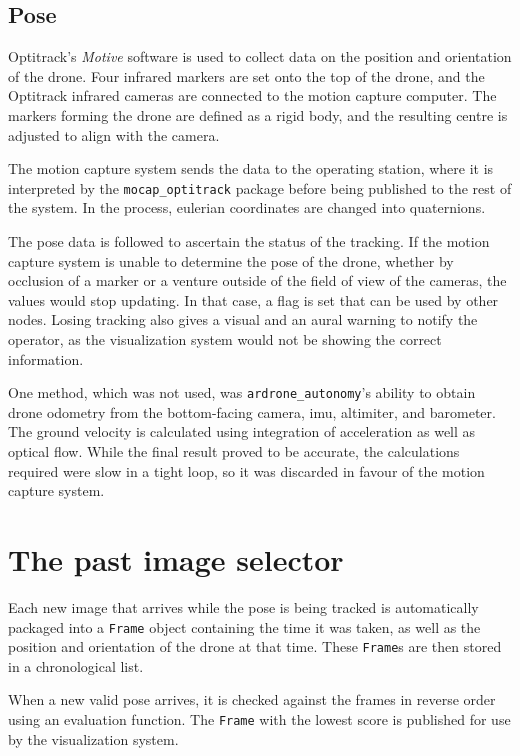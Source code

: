  \subsection{Pose}
    Optitrack's \emph{Motive} software is used to collect data on the position and orientation of the drone.
    Four infrared markers are set onto the top of the drone, and the Optitrack infrared cameras are connected to the motion capture computer.
    The markers forming the drone are defined as a rigid body, and the resulting centre is adjusted to align with the camera.

    The motion capture system sends the data to the operating station, where it is interpreted by the \verb|mocap_optitrack| package before being published to the rest of the system.
    In the process, eulerian coordinates are changed into quaternions.

    The pose data is followed to ascertain the status of the tracking.
    If the motion capture system is unable to determine the pose of the drone, whether by occlusion of a marker or a venture outside of the field of view of the cameras, the values would stop updating.
    In that case, a flag is set that can be used by other nodes.
    Losing tracking also gives a visual and an aural warning to notify the operator, as the visualization system would not be showing the correct information.

    One method, which was not used, was \verb|ardrone_autonomy|'s ability to obtain drone odometry from the bottom-facing camera, \gls{imu}, altimiter, and barometer.
    The ground velocity is calculated using integration of acceleration as well as optical flow.
    While the final result proved to be accurate, the calculations required were slow in a tight loop, so it was discarded in favour of the motion capture system.

\section{The past image selector}
  Each new image that arrives while the pose is being tracked is automatically packaged into a \texttt{Frame} object containing the time it was taken, as well as the position and orientation of the drone at that time.
  These \texttt{Frame}s are then stored in a chronological list.

  When a new valid pose arrives, it is checked against the frames in reverse order using an evaluation function.
  The \texttt{Frame} with the lowest score is published for use by the visualization system.

